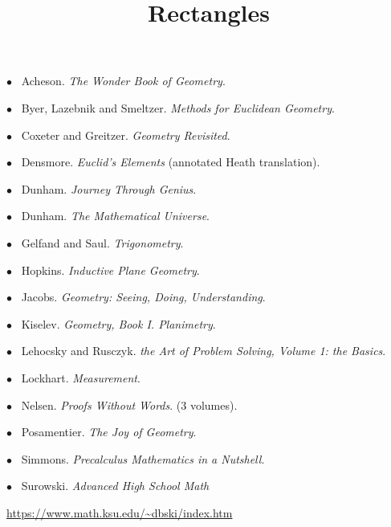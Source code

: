 \documentclass[11pt, oneside]{article}
\title{Rectangles}
\date{}
\begin{document}
\maketitle
\Large

\label{sec:list_of_references}


$\bullet$ \ Acheson.  \emph{The Wonder Book of Geometry}.

$\bullet$ \ Byer, Lazebnik and Smeltzer.  \emph{Methods for Euclidean Geometry}.

$\bullet$ \ Coxeter and Greitzer.  \emph{Geometry Revisited}.

$\bullet$ \ Densmore. \emph{Euclid's Elements} (annotated Heath translation).

$\bullet$ \ Dunham. \emph{Journey Through Genius}.

$\bullet$ \ Dunham. \emph{The Mathematical Universe}.

$\bullet$ \ Gelfand and Saul. \emph{Trigonometry}.

$\bullet$ \ Hopkins. \emph{Inductive Plane Geometry}.

$\bullet$ \ Jacobs. \emph{Geometry:  Seeing, Doing, Understanding}.

$\bullet$ \ Kiselev. \emph{Geometry, Book I. Planimetry}.

$\bullet$ \ Lehocsky and Rusczyk.  \emph{the Art of Problem Solving, Volume 1:  the Basics}.

$\bullet$ \ Lockhart. \emph{Measurement}.

$\bullet$ \ Nelsen. \emph{Proofs Without Words}.  (3 volumes).

$\bullet$ \ Posamentier.  \emph{The Joy of Geometry}.

$\bullet$ \ Simmons.  \emph{Precalculus Mathematics in a Nutshell}.

$\bullet$ \ Surowski.  \emph{Advanced High School Math}

\url{https://www.math.ksu.edu/~dbski/index.htm}
\end{document}
